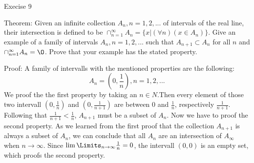\documentclass[12pt]{article}
\begin{document}
Execise 9

Theorem: Given an infinite collection $A_n,n=1,2,...$ of intervals of the real line, their intersection is defined to be $\cap_{n=1}^{\infty}A_n=\{x|(\forall n)(x\in A_n)\}$. Give an example of a family of intervals $A_n,n=1,2,...$ such that $A_{n+1}\subset A_n$ for all $n$ and $\cap_{n=1}^{\infty}A_n=\O$. Prove that your example has the stated property.

Proof: A family of intervalls with the mentioned properties are the following:
\[A_n=(0,\frac{1}{n}), n = 1,2,...\]
We proof the the first property by taking an $n \in N$.Then every element of those two intervall $(0,\frac{1}{n})$ and $(0,\frac{1}{n+1})$ are between 0 and $\frac{1}{n}$, respectively  $\frac{1}{n+1}$. Following that $\frac{1}{n+1} < \frac{1}{n}$, $A_{n+1}$ must be a subset of $A_n$.
Now we have to proof the second property. As we learned from the first proof that the collection $A_{n+1}$ is always a subset of $A_n$, we can conclude that all $A_n$ are an intersection of $A_\infty$ when $n \to \infty$.
Since $\lim \Limits_{n \to \infty} \frac{1}{n} = 0$, the intervall $(0, 0)$ is an empty set, which proofs the second property. 
\end{document}
